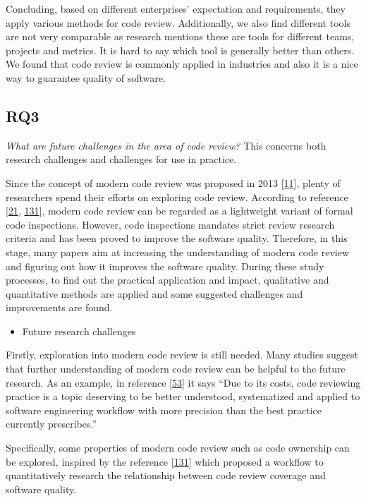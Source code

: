 \documentclass[]{book}
\providecommand{\tightlist}{%
  \setlength{\itemsep}{0pt}\setlength{\parskip}{0pt}}
\begin{document}
Concluding, based on different enterprises' expectation and
requirements, they apply various methods for code review. Additionally,
we also find different tools are not very comparable as research
mentions these are tools for different teams, projects and metrics. It
is hard to say which tool is generally better than others. We found that
code review is commonly applied in industries and also it is a nice way
to guarantee quality of software.

\subsection{RQ3}\label{rq3}

\emph{What are future challenges in the area of code review?} This
concerns both research challenges and challenges for use in practice.

Since the concept of modern code review was proposed in 2013
{[}\protect\hyperlink{ref-bacchelli2013expectations}{11}{]}, plenty of
researchers spend their efforts on exploring code review. According to
reference {[}\protect\hyperlink{ref-beller2014modern}{21},
\protect\hyperlink{ref-mcintosh2014impact}{131}{]}, modern code review
can be regarded as a lightweight variant of formal code inspections.
However, code inspections mandates strict review research criteria and
has been proved to improve the software quality. Therefore, in this
stage, many papers aim at increasing the understanding of modern code
review and figuring out how it improves the software quality. During
these study processes, to find out the practical application and impact,
qualitative and quantitative methods are applied and some suggested
challenges and improvements are found.

\begin{itemize}
\tightlist
\item
  Future research challenges
\end{itemize}

Firstly, exploration into modern code review is still needed. Many
studies suggest that further understanding of modern code review can be
helpful to the future research. As an example, in reference
{[}\protect\hyperlink{ref-czerwonka2015code}{53}{]} it says ``Due to its
costs, code reviewing practice is a topic deserving to be better
understood, systematized and applied to software engineering workflow
with more precision than the best practice currently prescribes.''

Specifically, some properties of modern code review such as code
ownership can be explored, inspired by the reference
{[}\protect\hyperlink{ref-mcintosh2014impact}{131}{]} which proposed a
workflow to quantitatively research the relationship between code review
coverage and software quality.
\end{document}
